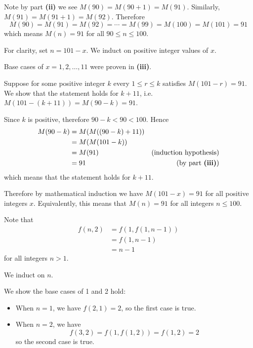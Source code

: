 \begin{questions}
\begin{partquestions}{\roman*}
        \item Note by part \textbf{(ii)} we see $M(90) = M(90 + 1) = M(91)$. Similarly, $M(91) = M(91 + 1) = M(92)$. Therefore
        \[
            M(90) = M(91) = M(92) = \cdots = M(99) = M(100) = M(101) = 91
        \]
        which means $M(n) = 91$ for all $90 \leq n \leq 100$.

        \item For clarity, set $n = 101 - x$. We induct on positive integer values of $x$.
        
        Base cases of $x = 1, 2, \dots, 11$ were proven in \textbf{(iii)}.

        Suppose for some positive integer $k$ every $1 \leq r \leq k$ satisfies $M(101 - r) = 91$. We show that the statement holds for $k + 11$, i.e. $M(101 - (k+11)) = M(90 - k) = 91$.

        Since $k$ is positive, therefore $90 - k < 90 < 100$. Hence
        \begin{align*}
            M(90 - k) &= M(M((90 - k) + 11))\\
            &= M(M(101 - k))\\
            &= M(91) & (\text{induction hypothesis})\\
            &= 91 & (\text{by part \textbf{(iii)}})
        \end{align*}
        which means that the statement holds for $k + 11$.

        Therefore by mathematical induction we have $M(101 - x) = 91$ for all positive integers $x$. Equivalently, this means that $M(n) = 91$ for all integers $n \leq 100$.
    \end{partquestions}

    \item \begin{partquestions}{\roman*}
        \item Note that
        \begin{align*}
            f(n,2) &= f(1, f(1, n-1))\\
            &= f(1, n-1)\\
            &= n-1
        \end{align*}
        for all integers $n > 1$.
        
        \item We induct on $n$.
        
        We show the base cases of 1 and 2 hold:
        \begin{itemize}
            \item When $n = 1$, we have $f(2, 1) = 2$, so the first case is true.
            \item When $n = 2$, we have
            \[
                f(3,2) = f(1, f(1, 2)) = f(1, 2) = 2
            \]
            so the second case is true.
        \end{itemize}
    

\end{partquestions}
\end{questions}
